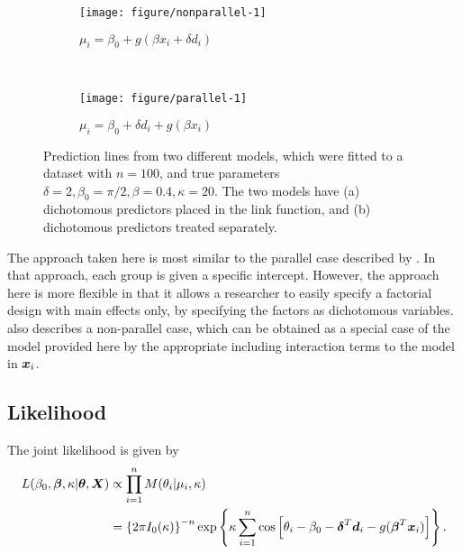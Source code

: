 \documentclass[10pt,a4paper]{article}\usepackage[]{graphicx}\usepackage[]{color}
\makeatletter
\def\maxwidth{ %
  \ifdim\Gin@nat@width>\linewidth
    \linewidth
  \else
    \Gin@nat@width
  \fi
}
\newenvironment{knitrout}{}{} %
\makeatother
\begin{document}
\begin{figure}
\label{parallel}
\begin{subfigure}[b]{0.5\textwidth}
\begin{knitrout}
\color{fgcolor}
\texttt{[image: figure/nonparallel-1]} 

\end{knitrout}
\caption{$\mu_i = \beta_0 + g(\beta x_i  + \delta d_i)$}
\end{subfigure}
~
\begin{subfigure}[b]{0.5\textwidth}
\begin{knitrout}
\color{fgcolor}
\texttt{[image: figure/parallel-1]} 

\end{knitrout}
\caption{$\mu_i = \beta_0  + \delta d_i + g(\beta x_i)$}
\end{subfigure}
\caption{Prediction lines from two different models, which were fitted to a dataset with $n = 100$, and true parameters $\delta = 2, \beta_0 = \pi/2, \beta = 0.4, \kappa = 20$. The two models have (a) dichotomous predictors placed in the link function, and (b) dichotomous predictors treated separately.}
\end{figure}

The approach taken here is most similar to the parallel case described by \citet{artes2008hypothesis}. In that approach, each group is given a specific intercept. However, the approach here is more flexible in that it allows a researcher to easily specify a factorial design with main effects only, by specifying the factors as dichotomous variables. \citet{artes2008hypothesis} also describes a non-parallel case, which can be obtained as a special case of the model provided here by the appropriate including interaction terms to the model in \( \boldsymbol{x}_i \).

\subsection{Likelihood}

The joint likelihood is given by
\begin{align}
L(\beta_0, \boldsymbol{\beta}, \kappa \vert \boldsymbol{\theta}, \boldsymbol{X}) &\propto  \prod_{i=1}^{n} M(\theta_i \vert \mu_i, \kappa) \\
&=  \left\lbrace 2 \pi I_0(\kappa) \right\rbrace^{-n} \exp \left\lbrace \kappa \sum_{i=1}^{n} \cos \left[ \theta_i - \beta_0 - \boldsymbol{\delta}^T \boldsymbol{d}_i - g(\boldsymbol{\beta}^T \boldsymbol{x}_i)\right]  \right\rbrace.
\end{align}
\end{document}
